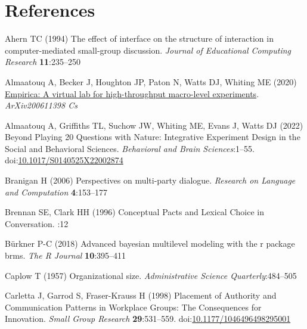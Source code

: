\documentclass[
  english,
  a4paper,
]{article}
\newlength{\cslhangindent}
\newlength{\cslentryspacingunit} %
\newenvironment{CSLReferences}[2] %
 {%
  \setlength{\parindent}{0pt}
  \ifodd #1
  \let\oldpar\par
  \def\par{\hangindent=\cslhangindent\oldpar}
  \fi
  \setlength{\parskip}{#2\cslentryspacingunit}
 }%
 {}
\begin{document}
\hypertarget{references}{%
\section{References}\label{references}}

\setlength{\parindent}{-0.1in} 
\setlength{\leftskip}{0.125in}

\noindent

\hypertarget{refs}{}
\begin{CSLReferences}{1}{0}
\leavevmode{}%
Ahern TC (1994) The effect of interface on the structure of interaction in computer-mediated small-group discussion. \emph{Journal of Educational Computing Research} \textbf{11}:235--250

\leavevmode{}%
Almaatouq A, Becker J, Houghton JP, Paton N, Watts DJ, Whiting ME (2020) \href{http://arxiv.org/abs/2006.11398}{Empirica: A virtual lab for high-throughput macro-level experiments}. \emph{ArXiv200611398 Cs}

\leavevmode{}%
Almaatouq A, Griffiths TL, Suchow JW, Whiting ME, Evans J, Watts DJ (2022) Beyond {Playing} 20 {Questions} with {Nature}: {Integrative Experiment Design} in the {Social} and {Behavioral Sciences}. \emph{Behavioral and Brain Sciences}:1--55. doi:\href{https://doi.org/10.1017/S0140525X22002874}{10.1017/S0140525X22002874}

\leavevmode{}%
Branigan H (2006) Perspectives on multi-party dialogue. \emph{Research on Language and Computation} \textbf{4}:153--177

\leavevmode{}%
Brennan SE, Clark HH (1996) Conceptual {Pacts} and {Lexical Choice} in {Conversation}. :12

\leavevmode{}%
Bürkner P-C (2018) Advanced bayesian multilevel modeling with the r package brms. \emph{The R Journal} \textbf{10}:395--411

\leavevmode{}%
Caplow T (1957) Organizational size. \emph{Administrative Science Quarterly}:484--505

\leavevmode{}%
Carletta J, Garrod S, Fraser-Krauss H (1998) Placement of {Authority} and {Communication Patterns} in {Workplace Groups}: {The Consequences} for {Innovation}. \emph{Small Group Research} \textbf{29}:531--559. doi:\href{https://doi.org/10.1177/1046496498295001}{10.1177/1046496498295001}


\end{CSLReferences}
\end{document}
